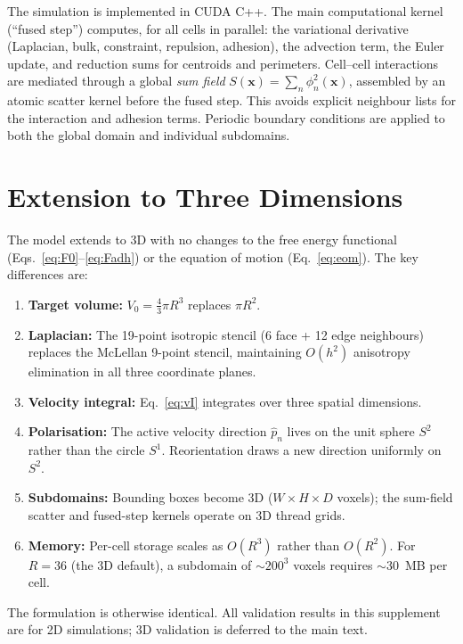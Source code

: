 \documentclass[11pt]{article}
\newcommand{\phin}{\phi_n}
\begin{document}
The simulation is implemented in CUDA C++.  The main computational kernel (``fused step'') computes, for all cells in parallel: the variational derivative (Laplacian, bulk, constraint, repulsion, adhesion), the advection term, the Euler update, and reduction sums for centroids and perimeters.  Cell--cell interactions are mediated through a global \emph{sum field} $S(\mathbf{x}) = \sum_n \phin^2(\mathbf{x})$, assembled by an atomic scatter kernel before the fused step.  This avoids explicit neighbour lists for the interaction and adhesion terms.  Periodic boundary conditions are applied to both the global domain and individual subdomains.

\section{Extension to Three Dimensions}
\label{sec:3d}

The model extends to 3D with no changes to the free energy functional (Eqs.~\ref{eq:F0}--\ref{eq:Fadh}) or the equation of motion (Eq.~\ref{eq:eom}).  The key differences are:

\begin{enumerate}
\item \textbf{Target volume:} $V_0 = \frac{4}{3}\pi R^3$ replaces $\pi R^2$.
\item \textbf{Laplacian:} The 19-point isotropic stencil (6 face + 12 edge neighbours) replaces the McLellan 9-point stencil, maintaining $O(h^2)$ anisotropy elimination in all three coordinate planes.
\item \textbf{Velocity integral:} Eq.~\eqref{eq:vI} integrates over three spatial dimensions.
\item \textbf{Polarisation:} The active velocity direction $\hat{p}_n$ lives on the unit sphere $S^2$ rather than the circle $S^1$.  Reorientation draws a new direction uniformly on $S^2$.
\item \textbf{Subdomains:} Bounding boxes become 3D ($W\times H\times D$ voxels); the sum-field scatter and fused-step kernels operate on 3D thread grids.
\item \textbf{Memory:} Per-cell storage scales as $O(R^3)$ rather than $O(R^2)$.  For $R=36$ (the 3D default), a subdomain of $\sim 200^3$ voxels requires $\sim$30~MB per cell.
\end{enumerate}

The formulation is otherwise identical.  All validation results in this supplement are for 2D simulations; 3D validation is deferred to the main text.
\end{document}
